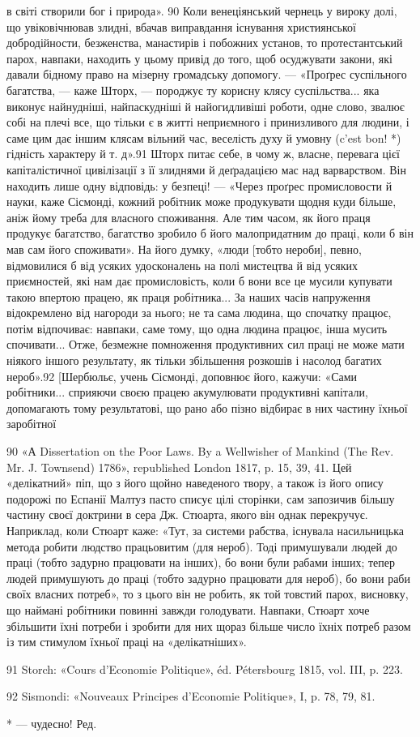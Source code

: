 в світі створили бог і природа». 90 Коли венеціянський чернець
у вироку долі, що увіковічнював злидні, вбачав виправдання
існування християнської добродійности, безженства, манастирів
і побожних установ, то протестантський парох, навпаки, находить
у цьому привід до того, щоб осуджувати закони, які давали бідному
право на мізерну громадську допомогу. — «Проґрес суспільного
багатства, — каже Шторх, — породжує ту корисну клясу суспільства...
яка виконує найнудніші, найпаскудніші й найогидливіші
роботи, одне слово, звалює собі на плечі все, що тільки є в житті
неприємного і принизливого для людини, і саме цим дає іншим
клясам вільний час, веселість духу й умовну (c’est bon! *) гідність
характеру й т. д».91 Шторх питає себе, в чому ж, власне,
перевага цієї капіталістичної цивілізації з її злиднями й деґрадацією
мас над варварством. Він находить лише одну відповідь:
у безпеці! — «Через проґрес промисловости й науки, каже Сісмонді,
кожний робітник може продукувати щодня куди більше,
аніж йому треба для власного споживання. Але тим часом, як
його праця продукує багатство, багатство зробило б його малопридатним
до праці, коли б він мав сам його споживати». На його
думку, «люди [тобто нероби], певно, відмовилися б від усяких
удосконалень на полі мистецтва й від усяких приємностей, які
нам дає промисловість, коли б вони все це мусили купувати
такою впертою працею, як праця робітника... За наших часів
напруження відокремлено від нагороди за нього; не та сама людина,
що спочатку працює, потім відпочиває: навпаки, саме
тому, що одна людина працює, інша мусить спочивати... Отже,
безмежне помноження продуктивних сил праці не може мати
ніякого іншого результату, як тільки збільшення розкошів і
насолод багатих нероб».92 [Шербюльє, учень Сісмонді, доповнює
його, кажучи: «Сами робітники... сприяючи своєю працею акумулювати
продуктивні капітали, допомагають тому результатові,
що рано або пізно відбирає в них частину їхньої заробітної

90 «А Dissertation on the Poor Laws. By a Wellwisher of Mankind
(The Rev. Mr. J. Townsend) 1786», republished London 1817, p. 15, 39,
41. Цей «делікатний» піп, що з його щойно наведеного твору, а також із
його опису подорожі по Еспанії Малтуз пасто списує цілі сторінки, сам
запозичив більшу частину своєї доктрини в сера Дж. Стюарта, якого він
однак перекручує. Наприклад, коли Стюарт каже: «Тут, за системи рабства,
існувала насильницька метода робити людство працьовитим (для
нероб). Тоді примушували людей до праці (тобто задурно працювати на
інших), бо вони були рабами інших; тепер людей примушують до праці
(тобто задурно працювати для нероб), бо вони раби своїх власних потреб»,
то з цього він не робить, як той товстий парох, висновку, що наймані
робітники повинні завжди голодувати. Навпаки, Стюарт хоче збільшити
їхні потреби і зробити для них щораз більше число їхніх потреб разом
із тим стимулом їхньої праці на «делікатніших».

91    Storch: «Cours d’Economie Politique», éd. Pétersbourg 1815, vol. III,
p. 223.

92    Sismondi: «Nouveaux Principes d’Economie Politique», I, p. 78,
79, 81.

* — чудесно! Ред.
